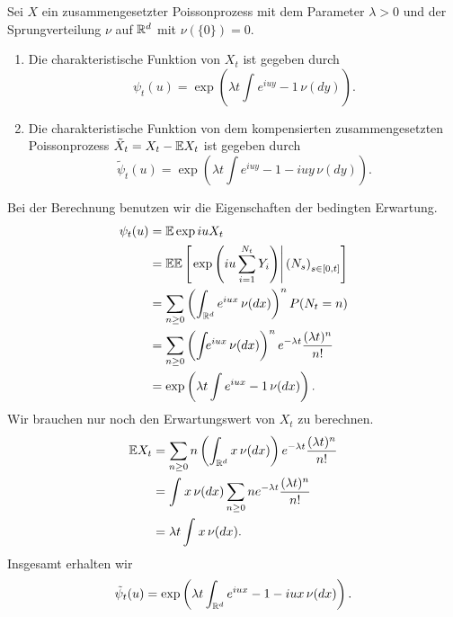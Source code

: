 Sei $X$ ein zusammengesetzter Poissonprozess mit dem Parameter $\lambda>0$ und
der Sprungverteilung $\nu$ auf $\mathbb{R}^d$ mit $\nu(\{0\})=0$. 
\begin{enumerate}
    \item Die charakteristische Funktion von $X_t$ ist gegeben durch
        \begin{equation*}
            \psi_t(u) = \exp \left( \lambda t \int_{}^{} e^{iuy}-1 \, \nu(dy) \right). 
        \end{equation*}
    \item Die charakteristische Funktion von dem kompensierten zusammengesetzten
        Poissonprozess $\tilde X_t = X_t - \mathbb{E} X_t$ ist gegeben durch
        \begin{equation*}
            \tilde \psi_t(u) = \exp \left( \lambda t \int e^{iuy}-1-iuy \, \nu(dy) \right). 
        \end{equation*}
\end{enumerate}

\solution Bei der Berechnung benutzen wir die Eigenschaften der bedingten
Erwartung.
\begin{align*}
    \psi_t (u) &= \mathbb{E} \exp iu X_t \\
    &= \mathbb{E} \mathbb{E} \left[ \left. \exp \left( iu \sum_{i=1}^{N_t} Y_i \right) \right| \left( N_s \right)_{s\in [0,t]} \right] \\
    &= \sum_{n \geq 0}^{} \left( \int_{\mathbb{R}^d} e^{iu x} \, \nu(dx) \right)^n P(N_t = n) \\
    &= \sum_{n \geq 0}^{} \left( \int_{} e^{iu x} \, \nu(dx) \right)^n
        e^{-\lambda t} \frac{(\lambda t)^n}{n!} \\
    &= \exp \left( \lambda t \int e^{iux}-1 \, \nu(dx) \right).
\end{align*}
Wir brauchen nur noch den Erwartungswert von $X_t$ zu berechnen. 
\begin{align*}
    \mathbb{E} X_t &= \sum_{n \geq 0}^{} n \left( \int_{\mathbb{R}^d} x\, \nu(dx) \right) 
    e^{-\lambda t} \frac{(\lambda t)^n}{n!} \\
    &= \int_{}^{} x \, \nu(dx) \sum_{n \geq 0} n e^{-\lambda t} \frac{(\lambda t)^n}{n!} \\
    &= \lambda t \int_{}^{} x \, \nu (dx). 
\end{align*}
Insgesamt erhalten wir 
\begin{equation*}
    \tilde \psi_t (u) = \exp \left( \lambda t \int_{\mathbb{R}^d} e^{iux}-1-iux \, \nu(dx) \right).
\end{equation*}


